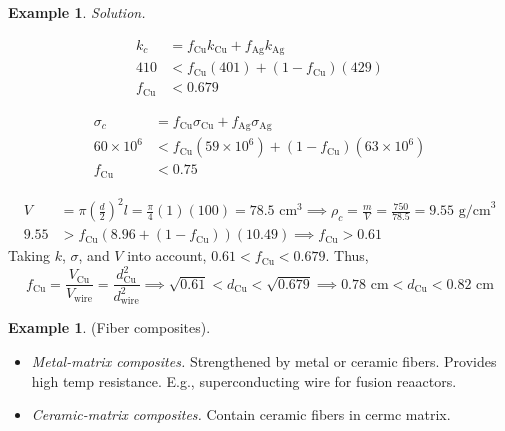 \documentclass{article}
\theoremstyle{definition}
\newtheorem{example}[definition]{Example}
\begin{document}
\begin{example}
    \textit{Solution.}
    \begin{minipage}{0.4\textwidth}
        \begin{align*}
            k_c &= f_{\text{Cu}} k_{\text{Cu}} + f_{\text{Ag}} k_{\text{Ag}} \\
            410 &< f_{\text{Cu}}(401) + (1-f_{\text{Cu}})(429) \\
            f_{\text{Cu}} &< 0.679
        \end{align*}
    \end{minipage}
    \hfill
    \begin{minipage}{0.5\textwidth}
        \begin{align*}
            \sigma_c &= f_{\text{Cu}} \sigma_{\text{Cu}} + f_{\text{Ag}} \sigma_{\text{Ag}} \\
            60 \times 10^6 &< f_{\text{Cu}} (59 \times 10^6) + (1-f_{\text{Cu}})(63\times10^6) \\
            f_{\text{Cu}} &< 0.75
        \end{align*}
    \end{minipage}
    \begin{align*}
        V & = \pi \left( \frac{d}{2} \right)^2 l = \frac{\pi}{4} (1)(100) = 78.5 \text{ cm}^3 \implies \rho_c = \frac{m}{V} = \frac{750}{78.5} = 9.55 \text{ g/cm}^3 \\
        9.55 &> f_{\text{Cu}} (8.96 + (1-f_{\text{Cu}}))(10.49) \implies f_{\text{Cu}} > 0.61
    \end{align*}
    Taking $k$, $\sigma$, and $V$ into account, $0.61 < f_{\text{Cu}} < 0.679$. Thus,
    \begin{equation*}
        f_{\text{Cu}} = \frac{V_{\text{Cu}}}{V_{\text{wire}}} = \frac{d_{\text{Cu}}^2}{d_{\text{wire}}^2} \implies \sqrt{0.61} < d_{\text{Cu}} < \sqrt{0.679} \implies 0.78 \text{ cm} < d_{\text{Cu}} < 0.82 \text{ cm}
    \end{equation*}
\end{example}

\begin{example}
    (Fiber composites).
    \begin{itemize}
        \item \textit{Metal-matrix composites.} Strengthened by metal or ceramic fibers. Provides high temp resistance. E.g., superconducting wire for fusion reaactors.
        \item \textit{Ceramic-matrix composites.} Contain ceramic fibers in cermc matrix.
    \end{itemize}
\end{example}
\end{document}
